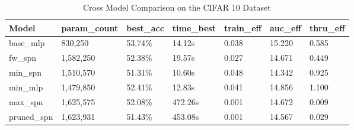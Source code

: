 \begin{table}[h!]
    \centering
    \begin{tabular}{|l|l|l|l|l|l|l|}
    \hline
    \textbf{Model} & \textbf{param\_count} & \textbf{best\_acc} & \textbf{time\_best} & \textbf{train\_eff} & \textbf{auc\_eff} & \textbf{thru\_eff} \\
    \hline
    base\_mlp & 830,250 & \cellcolor{green!25}53.74\% & 14.12s & 0.038 & \cellcolor{green!25}15.220 & 0.585 \\
    fw\_spn & 1,582,250 & 52.38\% & 19.57s & 0.027 & 14.671 & 0.449 \\
    min\_spn & 1,510,570 & \cellcolor{red!25}51.31\% & \cellcolor{green!25}10.60s & \cellcolor{green!25}0.048 & \cellcolor{red!25}14.342 & 0.925 \\
    min\_mlp & 1,479,850 & 52.41\% & 12.83s & 0.041 & 14.856 & \cellcolor{green!25}1.100 \\
    max\_spn & 1,625,575 & 52.08\% & \cellcolor{red!25}472.26s & \cellcolor{red!25}0.001 & 14.672 & \cellcolor{red!25}0.009 \\
    pruned\_spn & 1,623,931 & 51.43\% & 453.08s & \cellcolor{red!25}0.001 & 14.567 & 0.029 \\
    \hline
    \end{tabular}
    \caption{Cross Model Comparison on the CIFAR 10 Dataset}
    \label{tab:cifarResults}
\end{table}

